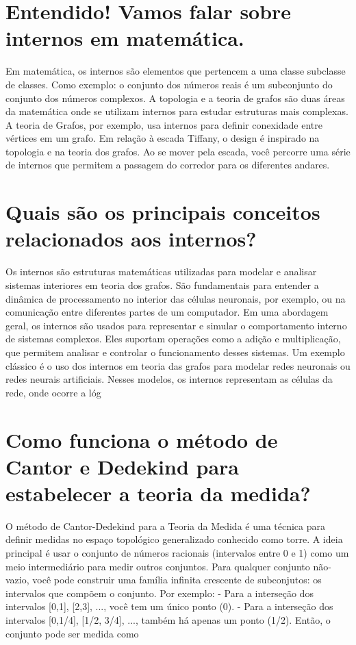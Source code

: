 \documentclass[11pt,a4paper]{article}
\begin{document}
\section{Entendido! Vamos falar sobre internos em matemática.}
Em matemática, os internos são elementos que pertencem a uma classe subclasse de classes. Como exemplo: o conjunto dos números reais é um subconjunto do conjunto dos números complexos. A topologia e a teoria de grafos são duas áreas da matemática onde se utilizam internos para estudar estruturas mais complexas. A teoria de Grafos, por exemplo, usa internos para definir conexidade entre vértices em um grafo. Em relação à escada Tiffany, o design é inspirado na topologia e na teoria dos grafos. Ao se mover pela escada, você percorre uma série de internos que permitem a passagem do corredor para os diferentes andares.

\section{Quais são os principais conceitos relacionados aos internos?}
Os internos são estruturas matemáticas utilizadas para modelar e analisar sistemas interiores em teoria dos grafos. São fundamentais para entender a dinâmica de processamento no interior das células neuronais, por exemplo, ou na comunicação entre diferentes partes de um computador. Em uma abordagem geral, os internos são usados para representar e simular o comportamento interno de sistemas complexos. Eles suportam operações como a adição e multiplicação, que permitem analisar e controlar o funcionamento desses sistemas. Um exemplo clássico é o uso dos internos em teoria das grafos para modelar redes neuronais ou redes neurais artificiais. Nesses modelos, os internos representam as células da rede, onde ocorre a lóg

\section{Como funciona o método de Cantor e Dedekind para estabelecer a teoria da medida?}
O método de Cantor-Dedekind para a Teoria da Medida é uma técnica para definir medidas no espaço topológico generalizado conhecido como torre. A ideia principal é usar o conjunto de números racionais (intervalos entre 0 e 1) como um meio intermediário para medir outros conjuntos. Para qualquer conjunto não-vazio, você pode construir uma família infinita crescente de subconjutos: os intervalos que compõem o conjunto. Por exemplo: - Para a interseção dos intervalos [0,1], [2,3], ..., você tem um único ponto (0). - Para a interseção dos intervalos [0,1/4], [1/2, 3/4], ..., também há apenas um ponto (1/2). Então, o conjunto pode ser medida como
\end{document}
